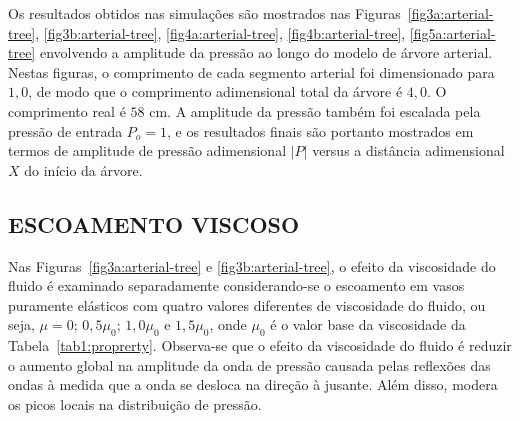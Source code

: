 Os resultados obtidos nas simulações são mostrados nas Figuras~\ref{fig3a:arterial-tree}, \ref{fig3b:arterial-tree}, \ref{fig4a:arterial-tree}, \ref{fig4b:arterial-tree}, \ref{fig5a:arterial-tree} envolvendo a amplitude da pressão ao longo do modelo de árvore arterial. Nestas figuras, o comprimento de cada segmento arterial foi dimensionado para $1,0$, de modo que o comprimento adimensional total da árvore é $4,0$. O comprimento real é $58$ cm. A amplitude da pressão também foi escalada pela pressão de entrada $P_o = 1$, e os resultados finais são portanto mostrados em termos de amplitude de pressão adimensional $|P|$ versus a distância adimensional $X$ do início da árvore.


\subsection{ESCOAMENTO VISCOSO}\label{sec:cenario1}

Nas Figuras~\ref{fig3a:arterial-tree} e \ref{fig3b:arterial-tree}, o efeito da viscosidade do fluido é examinado separadamente conside\-ran\-do-se o escoamento em vasos puramente elásticos com quatro valores diferentes de viscosidade do fluido, ou seja, $\mu = 0$; $0,5 \mu_0$; $1,0 \mu_0$ e $1,5 \mu_0$, onde $\mu_0$ é o valor base da viscosidade da Tabela~\ref{tab1:proprerty}. Observa-se que o efeito da viscosidade do fluido é reduzir o aumento global na amplitude da onda de pressão causada pelas reflexões das ondas à medida que a onda se desloca na direção à jusante. Além disso, modera os picos locais na distribuição de pressão.

